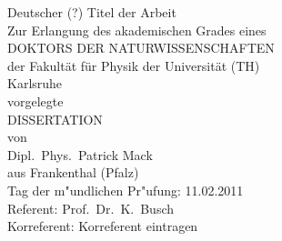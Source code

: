 
\begin{titlepage}
\vspace*{2.0cm}
\begin{center}
{\LARGE \color{red} Deutscher (?) Titel der Arbeit}\\[1.5cm]
Zur Erlangung des akademischen Grades eines\\[1cm]
{\Large DOKTORS DER NATURWISSENSCHAFTEN}\\[1cm]
der Fakult\"at f\"ur Physik der Universit\"at (TH)\\
Karlsruhe\\[0.5cm]
vorgelegte\\[0.5cm]
{\Large DISSERTATION}\\[0.5cm]
von\\[0.5cm]
{\color{red} Dipl.~Phys.~Patrick Mack}\\
{\color{red} aus Frankenthal (Pfalz)}\\[0.5cm]
\vspace{\fill}
Tag der m"undlichen Pr"ufung: {\color{red} 11.02.2011}\\
Referent: {\color{red} Prof.~Dr.~K.~Busch}\\
Korreferent: {\color{red} Korreferent eintragen}
\end{center}
\end{titlepage}
\thispagestyle{empty}
\cleardoublepage
